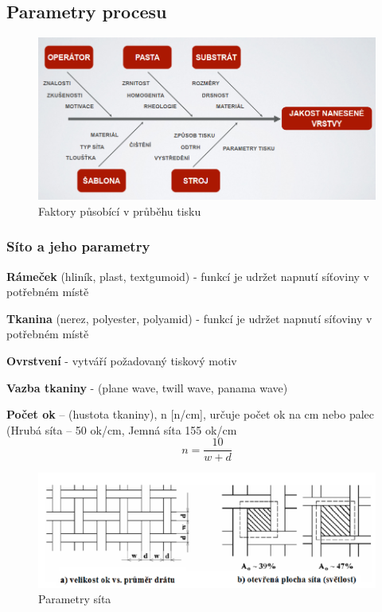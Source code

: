 \subsection{Parametry procesu}
\begin{figure}[h]
   \begin{center}
     \includegraphics[scale=0.6]{images/Faktory.png}
   \end{center}
   \caption{Faktory působící v průběhu tisku}
\end{figure}

\subsubsection{Síto a jeho parametry}
\textbf{Rámeček} (hliník, plast, textgumoid) - funkcí je udržet napnutí
síťoviny v potřebném místě

\textbf{Tkanina} (nerez, polyester, polyamid) - funkcí je udržet napnutí síťoviny v potřebném místě

\textbf{Ovrstvení} - vytváří požadovaný tiskový motiv

\textbf{Vazba tkaniny} - (plane wave, twill wave, panama wave)

\textbf{Počet ok} – (hustota tkaniny), n [n/cm], určuje počet ok na cm nebo palec (Hrubá síta – 50 ok/cm, Jemná síta 155 ok/cm
\begin{equation}
n = \frac{10}{w+d}
\end{equation}

\begin{figure}[h]
   \begin{center}
     \includegraphics[scale=0.6]{images/Sito.png}
   \end{center}
   \caption{Parametry síta}
\end{figure}

